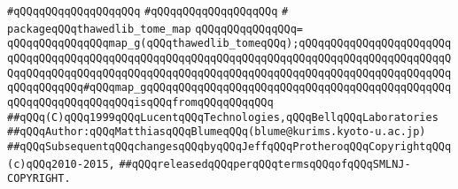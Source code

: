 \verb|#qQQqqQQqqQQqqQQqqQQq|\newline
\verb|#qQQqqQQqqQQqqQQqqQQq|\newline
\verb|#|\newline
\verb|packageqQQqthawedlib_tome_map|\newline
\verb|qQQqqQQqqQQqqQQq=|\newline
\verb|qQQqqQQqqQQqqQQqmap_g(qQQqthawedlib_tomeqQQq);qQQqqQQqqQQqqQQqqQQqqQQqqQQqqQQqqQQqqQQqqQQqqQQqqQQqqQQqqQQqqQQqqQQqqQQqqQQqqQQqqQQqqQQqqQQqqQQqqQQqqQQqqQQqqQQqqQQqqQQqqQQqqQQqqQQqqQQqqQQqqQQqqQQqqQQqqQQqqQQqqQQqqQQqqQQqqQQq#qQQqmap_gqQQqqQQqqQQqqQQqqQQqqQQqqQQqqQQqqQQqqQQqqQQqqQQqqQQqqQQqqQQqqQQqqQQqisqQQqfromqQQqqQQqqQQq|\newline
\newline
\newline
\newline
\verb|##qQQq(C)qQQq1999qQQqLucentqQQqTechnologies,qQQqBellqQQqLaboratories|\newline
\verb|##qQQqAuthor:qQQqMatthiasqQQqBlumeqQQq(blume@kurims.kyoto-u.ac.jp)|\newline
\verb|##qQQqSubsequentqQQqchangesqQQqbyqQQqJeffqQQqProtheroqQQqCopyrightqQQq(c)qQQq2010-2015,|\newline
\verb|##qQQqreleasedqQQqperqQQqtermsqQQqofqQQqSMLNJ-COPYRIGHT.|\newline

